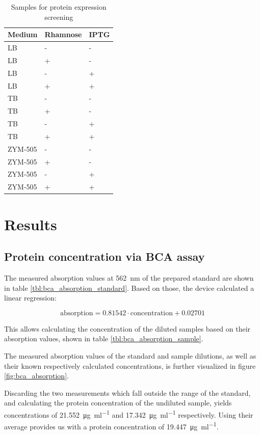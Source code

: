 \documentclass[a4paper]{scrreprt}
\begin{document}
\begin{table}
	\centering
	\begin{tabu}{lll}
		\toprule
		Medium & Rhamnose & IPTG \\
		\midrule
		LB & - & - \\
		LB & + & - \\
		LB & - & + \\
		LB & + & + \\

		TB & - & - \\
		TB & + & - \\
		TB & - & + \\
		TB & + & + \\

		ZYM-505 & - & - \\
		ZYM-505 & + & - \\
		ZYM-505 & - & + \\
		ZYM-505 & + & + \\
		\bottomrule
	\end{tabu}
	\caption{Samples for protein expression screening}
	\label{tbl:expression_samples}
\end{table}

\chapter{Results}

\section{Protein concentration via BCA assay}

The measured absorption values at \SI{562}{\nm} of the prepared standard are
shown in table \ref{tbl:bca_absorption_standard}. Based on those, the device
calculated a linear regression:

\[
	\text{absorption} = 0.81542 \cdot \text{concentration} + 0.02701
\]

This allows calculating the concentration of the diluted samples based on their
absorption values, shown in table \ref{tbl:bca_absorption_sample}.

The measured absorption values of the standard and sample dilutions, as well as
their known respectively calculated concentrations, is further visualized in
figure \ref{fig:bca_absorption}.

Discarding the two measurements which fall outside the range of the standard,
and calculating the protein concentration of the undiluted sample, yields
concentrations of \SI{21.552}{\ug\per\ml} and \SI{17.342}{\ug\per\ml}
respectively. Using their average provides us with a protein concentration of
\SI{19.447}{\ug\per\ml}.
\end{document}
